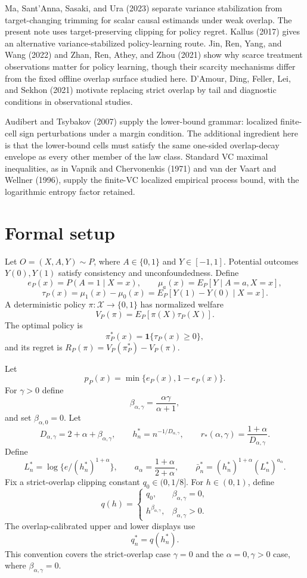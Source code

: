 \documentclass[11pt]{article}
\newcommand{\one}{\mathbf{1}}
\theoremstyle{definition}
\theoremstyle{plain}
\theoremstyle{remark}
\begin{document}
Ma, Sant'Anna, Sasaki, and Ura (2023) separate variance stabilization from
target-changing trimming for scalar causal estimands under weak overlap.  The
present note uses target-preserving clipping for policy regret.  Kallus
(2017) gives an alternative variance-stabilized policy-learning route.  Jin,
Ren, Yang, and Wang (2022) and Zhan, Ren, Athey, and Zhou (2021) show why
scarce treatment observations matter for policy learning, though their
scarcity mechanisms differ from the fixed offline overlap surface studied
here.  D'Amour, Ding, Feller, Lei, and Sekhon (2021) motivate replacing
strict overlap by tail and diagnostic conditions in observational studies.

Audibert and Tsybakov (2007) supply the lower-bound grammar: localized
finite-cell sign perturbations under a margin condition.  The additional
ingredient here is that the lower-bound cells must satisfy the same
one-sided overlap-decay envelope as every other member of the law class.
Standard VC maximal inequalities, as in Vapnik and Chervonenkis (1971) and
van der Vaart and Wellner (1996), supply the finite-VC localized empirical
process bound, with the logarithmic entropy factor retained.

\section{Formal setup}
Let \(O=(X,A,Y)\sim P\), where \(A\in\{0,1\}\) and \(Y\in[-1,1]\).  Potential
outcomes \(Y(0),Y(1)\) satisfy consistency and unconfoundedness.  Define
\[
e_P(x)=P(A=1\mid X=x),\qquad
\mu_a(x)=E_P[Y\mid A=a,X=x],
\]
\[
\tau_P(x)=\mu_1(x)-\mu_0(x)=E_P[Y(1)-Y(0)\mid X=x].
\]
A deterministic policy \(\pi:\mathcal X\to\{0,1\}\) has normalized welfare
\[
V_P(\pi)=E_P[\pi(X)\tau_P(X)].
\]
The optimal policy is
\[
\pi_P^*(x)=\one\{\tau_P(x)\ge0\},
\]
and its regret is \(R_P(\pi)=V_P(\pi_P^*)-V_P(\pi)\).

Let
\[
p_P(x)=\min\{e_P(x),1-e_P(x)\}.
\]
For \(\gamma>0\) define
\[
\beta_{\alpha,\gamma}=\frac{\alpha\gamma}{\alpha+1},
\]
and set \(\beta_{\alpha,0}=0\).  Let
\[
D_{\alpha,\gamma}=2+\alpha+\beta_{\alpha,\gamma},\qquad
h_n^*=n^{-1/D_{\alpha,\gamma}},\qquad
r_*(\alpha,\gamma)=\frac{1+\alpha}{D_{\alpha,\gamma}}.
\]
Define
\[
L_n^*=\log\{e/(h_n^*)^{1+\alpha}\},\qquad
a_\alpha=\frac{1+\alpha}{2+\alpha},\qquad
\bar\rho_n^*=(h_n^*)^{1+\alpha}(L_n^*)^{a_\alpha}.
\]
Fix a strict-overlap clipping constant \(q_0\in(0,1/8]\).  For
\(h\in(0,1)\), define
\[
q(h)=
\begin{cases}
q_0, & \beta_{\alpha,\gamma}=0,\\
h^{\beta_{\alpha,\gamma}}, & \beta_{\alpha,\gamma}>0.
\end{cases}
\]
The overlap-calibrated upper and lower displays use
\[
q_n^*=q(h_n^*).
\]
This convention covers the strict-overlap case \(\gamma=0\) and the
\(\alpha=0,\gamma>0\) case, where \(\beta_{\alpha,\gamma}=0\).
\end{document}
